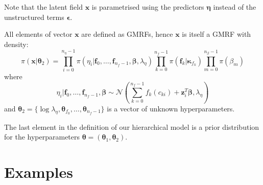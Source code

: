 \documentclass[a4paper,11pt]{article}
\def\mm#1{\ensuremath{\boldsymbol{#1}}} %
\begin{document}
Note that  the latent field $\mm{x}$ is
parametrised using the predictors $\mm{\eta}$ instead of the
unstructured terms $\mm{\epsilon}$.

All elements of vector $\mm{x}$ are defined as GMRFs, hence $\mm{x}$
is itself a GMRF with density:
\begin{equation}\label{eq3}
    \pi(\mm{x}|\mm{\theta}_2)=
    \prod_{i=0}^{n_{\eta}-1}\pi(\eta_i|\mm{f}_0,\dots,\mm{f}_{n_f-1},\mm{\beta},\lambda_{\eta})
    \prod_{k=0}^{n_f-1}\pi(\mm{f}_k|\mm{\kappa}_{f_k})\prod_{m=0}^{n_{\beta}-1}\pi(\beta_m)
\end{equation}
where
\begin{equation}\label{predictor}
    \eta_i|\mm{f}_0,\dots,\mm{f}_{n_f-1},\mm{\beta}\sim\mathcal{N}(\sum_{k=0}^{n_f-1} f_k( c_{ki}) + \mm{z}_i^T\mm{\beta},\lambda_{\eta})
\end{equation}
and
$\mm{\theta}_2=\{\log\lambda_{\eta},\mm{\theta}_{f_0},\dots,\mm{\theta}_{n_f-1}\}$
is a vector of unknown hyperparameters. 

The last element in the definition of our hierarchical model is a
prior distribution for the hyperparameters
$\mm{\theta}=(\mm{\theta}_1,\mm{\theta}_2)$. 

\section{Examples}
\end{document}
